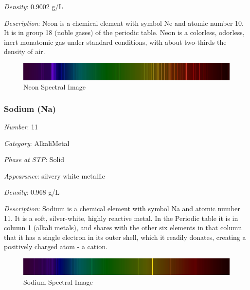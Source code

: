 \documentclass{article}
\begin{document}
\textit{Density}: 0.9002 g/L

\textit{Description}: Neon is a chemical element with symbol Ne and atomic number 10. It is in group 18 (noble gases) of the periodic table. Neon is a colorless, odorless, inert monatomic gas under standard conditions, with about two-thirds the density of air.

\immediate{}
\begin{figure}[!ht]
    \centering
    \includegraphics[width=12cm]{./resources/spectral_img/Neon_spectra.jpg}
    \caption{Neon Spectral Image}
\end{figure}

\hypertarget{subsubsection::Na}{}\subsubsection{Sodium (Na)}

\textit{Number}: 11

\textit{Category}: AlkaliMetal

\textit{Phase at STP}: Solid

\textit{Appearance}: silvery white metallic

\textit{Density}: 0.968 g/L

\textit{Description}: Sodium is a chemical element with symbol Na and atomic number 11. It is a soft, silver-white, highly reactive metal. In the Periodic table it is in column 1 (alkali metals), and shares with the other six elements in that column that it has a single electron in its outer shell, which it readily donates, creating a positively charged atom - a cation.

\immediate{}
\begin{figure}[!ht]
    \centering
    \includegraphics[width=12cm]{./resources/spectral_img/Sodium_Spectra.jpg}
    \caption{Sodium Spectral Image}
\end{figure}
\end{document}
